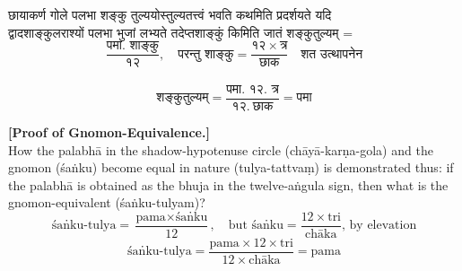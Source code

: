 \documentclass[11pt,a4paper]{article}
\newcommand{\dev}[1]{{\devanagarifont #1}}
\newcommand{\bilingualpair}[2]{%
  \noindent%
  \begin{minipage}[t]{0.48\textwidth}
    #1%
  \end{minipage}%
  \hfill%
  \begin{minipage}[t]{0.48\textwidth}
    #2%
  \end{minipage}%
  \par\vspace{0.5em}%
}
\newenvironment{sanskritcol}{\devanagarifont\small}{}
\newenvironment{englishcol}{\iastfont\small}{}
\begin{document}
\bilingualpair{%
\begin{sanskritcol}
\dev{छायाकर्ण गोले पलभा शङ्कु तुल्ययोस्तुल्यतत्त्वं भवति कथमिति प्रदर्शयते यदि}\\[0.3em]
\dev{द्वादशाङ्कुलराश्यों पलभा भुजां लभ्यते तदेप्तशाङ्कुं किमिति जातं शङ्कुतुल्यम् =}\\[0.5em]
\begin{equation*}
\frac{\text{पमा. शाङ्कु}}{१२}, \quad \text{परन्तु शाङ्कु} = \frac{१२ \times \text{त्र}}{\text{छाक}} \quad \text{शत उत्थापनेन}
\end{equation*}\\[0.5em]
\begin{equation*}
\text{शङ्कुतुल्यम्} = \frac{\text{पमा. १२. त्र}}{१२.\ \text{छाक}} = \text{पमा}
\end{equation*}
\end{sanskritcol}%
}{%
\begin{englishcol}
\textbf{[Proof of Gnomon-Equivalence.]}\\[0.3em]
How the palabhā in the shadow-\-hypotenuse circle (chāyā-karṇa-gola) and the gnomon (\'saṅku) become equal in nature (tulya-tattvaṃ) is demonstrated thus: if the palabhā is obtained as the bhuja in the twelve-\-aṅgula sign, then what is the gnomon-\-equivalent (\'saṅku-tulyam)?\\[0.3em]
\[ \text{\'saṅku-tulya} = \frac{\text{pama} \times \text{\'saṅku}}{12}, \quad \text{but } \text{\'saṅku} = \frac{12 \times \text{tri}}{\text{chāka}} \text{, by elevation} \]
\[ \text{\'saṅku-tulya} = \frac{\text{pama} \times 12 \times \text{tri}}{12 \times \text{chāka}} = \text{pama} \]
\end{englishcol}%
}
\end{document}
